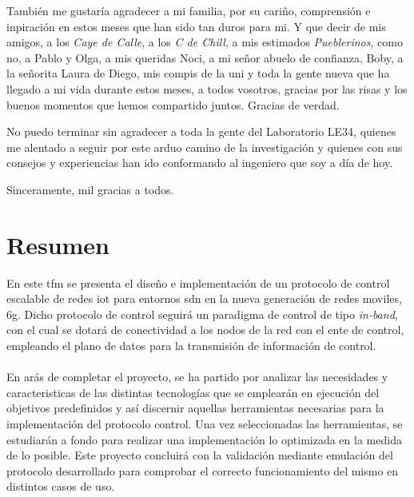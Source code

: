 También me gustaría agradecer a mi familia, por su cariño, comprensión e inpiración en estos meses que han sido tan duros para mi. 	Y que decir de mis amigos, a los \textit{Caye de Calle}, a los \textit{C de Chill},  a mis estimados \textit{Pueblerinos}, como no, a Pablo y Olga, a mis queridas Noci, a mi señor abuelo de confianza, Boby, a la señorita Laura de Diego, mis compis de la uni y toda la gente nueva que ha llegado a mi vida durante estos meses, a todos vosotros, gracias por las risas y los buenos momentos que hemos compartido juntos. Gracias de verdad. \newline


No puedo terminar sin agradecer a toda la gente del Laboratorio LE34, quienes me alentado a seguir por este arduo camino de la investigación y quienes con sus consejos y experiencias han ido conformando al ingeniero que soy a día de hoy.

\vspace{0.5cm}

Sinceramente, mil gracias a todos.




\cleardoublepage %



\chapter{Resumen}
\thispagestyle{empty}
En este \gls{tfm} se presenta el diseño e implementación de un protocolo de control escalable de redes \gls{iot} para entornos \gls{sdn} en la nueva generación de redes moviles, \gls{6g}. Dicho protocolo de control seguirá un paradigma de control de tipo \textit{in-band}, con el cual se dotará de conectividad a los nodos de la red con el ente de control, empleando el plano de datos para la transmisión de información de control.\\
\\
En arás de completar el proyecto,  se ha partido por analizar las necesidades y caracteristicas de las distintas tecnologías que se emplearán en ejecución del objetivos predefinidos y así discernir aquellas herramientas necesarias para la implementación del protocolo control. Una vez seleccionadas las herramientas, se estudiarán a fondo para realizar una implementación lo optimizada en la medida de lo posible. Este proyecto concluirá con la validación mediante emulación del protocolo desarrollado para comprobar el correcto funcionamiento del mismo en distintos casos de uso.

